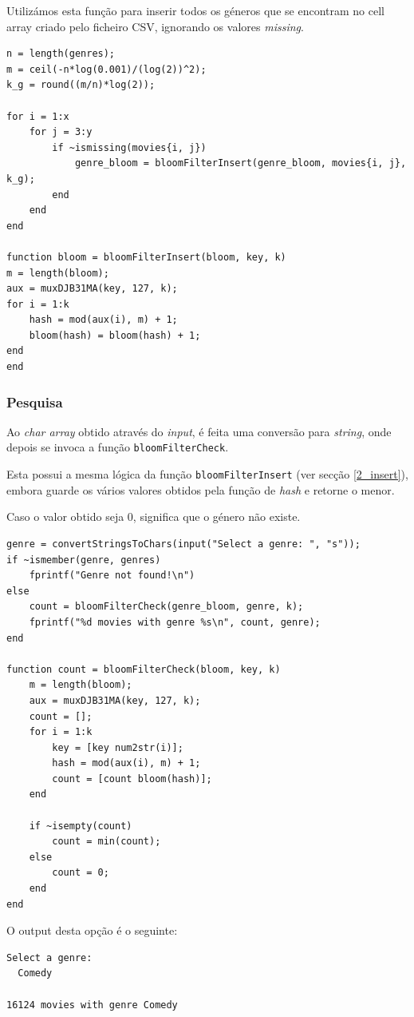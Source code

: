 \documentclass[portuguese, 11pt, a4paper,titlepage, oneside]{article}
\begin{document}
Utilizámos esta função para inserir todos os géneros que se encontram no cell array criado pelo ficheiro CSV, ignorando os valores \textit{missing}.

\begin{lstlisting}[style=Matlab-editor]
n = length(genres);
m = ceil(-n*log(0.001)/(log(2))^2);
k_g = round((m/n)*log(2));

for i = 1:x
    for j = 3:y
        if ~ismissing(movies{i, j})
            genre_bloom = bloomFilterInsert(genre_bloom, movies{i, j}, k_g);
        end
    end
end

function bloom = bloomFilterInsert(bloom, key, k)
m = length(bloom);
aux = muxDJB31MA(key, 127, k);
for i = 1:k
    hash = mod(aux(i), m) + 1;
    bloom(hash) = bloom(hash) + 1;
end
end
\end{lstlisting}

\subsubsection{Pesquisa}
Ao \textit{char array} obtido através do \textit{input}, é feita uma conversão para \textit{string}, onde depois se invoca a função \verb|bloomFilterCheck|.

Esta possui a mesma lógica da função \verb|bloomFilterInsert| (ver secção \ref{2_insert}), embora guarde os vários valores obtidos pela função de \textit{hash} e retorne o menor.

Caso o valor obtido seja 0, significa que o género não existe.

\begin{lstlisting}[style=Matlab-editor]
genre = convertStringsToChars(input("Select a genre: ", "s"));
if ~ismember(genre, genres)
    fprintf("Genre not found!\n")
else
    count = bloomFilterCheck(genre_bloom, genre, k);
    fprintf("%d movies with genre %s\n", count, genre);
end

function count = bloomFilterCheck(bloom, key, k)
    m = length(bloom);
    aux = muxDJB31MA(key, 127, k);
    count = [];
    for i = 1:k
        key = [key num2str(i)];
        hash = mod(aux(i), m) + 1;
        count = [count bloom(hash)];
    end
    
    if ~isempty(count)
        count = min(count);
    else
        count = 0;
    end
end
\end{lstlisting}

O output desta opção é o seguinte:
\begin{lstlisting}[style=Matlab-editor]
Select a genre: 
  Comedy

16124 movies with genre Comedy
\end{lstlisting}
\end{document}
